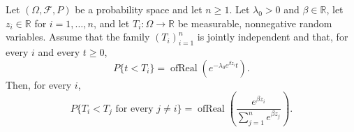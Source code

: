\begin{theorem}
Let $(\Omega,\mathcal F,P)$ be a probability space and let $n\ge1$.
Let $\lambda_0>0$ and $\beta\in\mathbb R$, let
$z_i\in\mathbb R$ for $i=1,\ldots,n$, and let
$T_i:\Omega\to\mathbb R$ be measurable, nonnegative random variables.
Assume that the family $(T_i)_{i=1}^n$ is jointly independent and that, for
every $i$ and every $t\ge0$,
\[
  P\{t<T_i\}
  =\operatorname{ofReal}
    \!\left(e^{-\lambda_0e^{\beta z_i}t}\right).
\]
Then, for every $i$,
\[
  P\{T_i<T_j\text{ for every }j\ne i\}
  =\operatorname{ofReal}\!\left(
    \frac{e^{\beta z_i}}{\sum_{j=1}^n e^{\beta z_j}}
  \right).
\]
\end{theorem}

